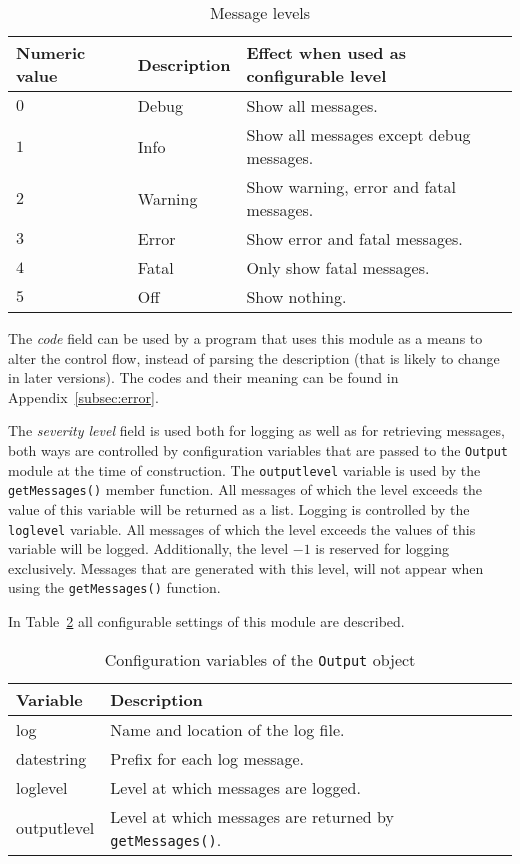 \documentclass{article}
\begin{document}
\begin{table}[H]
\begin{center}
\begin{tabular}{l|l|l}
Numeric value & Description & Effect when used as configurable level \\
\hline
$0$           & Debug   & Show all messages. \\
$1$           & Info    & Show all messages except debug messages. \\
$2$           & Warning & Show warning, error and fatal messages. \\
$3$           & Error   & Show error and fatal messages. \\
$4$           & Fatal   & Only show fatal messages. \\
$5$           & Off     & Show nothing. \\
\end{tabular}
\caption{Message levels} \label{tab:messagelevel}
\end{center}
\end{table}

The \emph{code} field can be used by a program that uses this module as a means to alter the control flow, instead of parsing the description (that is likely
to change in later versions). The codes and their meaning can be found in 
Appendix~\ref{subsec:error}.

The \emph{severity level} field is used both for logging as well as for
retrieving messages, both ways are controlled by configuration variables that
are passed to the \texttt{Output} module at the time of construction. 
The \texttt{outputlevel} variable is used by the \texttt{getMessages()} member
function. All messages of which the level exceeds the value of this variable
will be returned as a list. Logging is controlled by the \texttt{loglevel}
variable. All messages of which the level exceeds the values of this variable
will be logged. Additionally, the level $-1$ is reserved for logging
exclusively. Messages that are generated with this level, will not appear when
using the \texttt{getMessages()} function. 

In Table~\ref{tab:outputconfig} all configurable settings of this module are
described.

\begin{table}[H]
\begin{center}
\begin{tabular}{l|l}
Variable    & Description \\
\hline
log         & Name and location of the log file. \\
datestring  & Prefix for each log message. \\
loglevel    & Level at which messages are logged. \\
outputlevel & Level at which messages are returned by \texttt{getMessages()}.
\end{tabular}
\caption{Configuration variables of the \texttt{Output} object} 
\label{tab:outputconfig}
\end{center}
\end{table}
\end{document}
